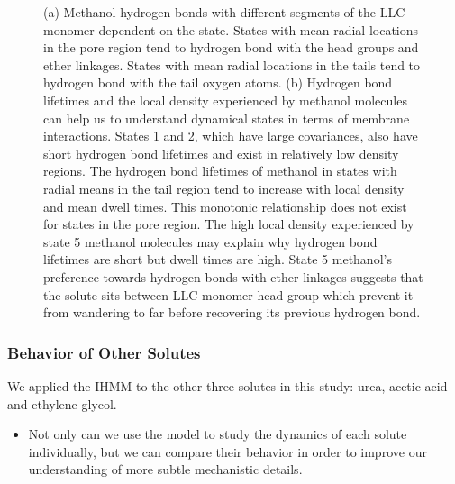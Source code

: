\documentclass{article}
\begin{document}
\begin{figure}
  \caption{(a) Methanol hydrogen bonds with different segments of the LLC monomer
  dependent on the state. States with mean radial locations in the pore region tend to
  hydrogen bond with the head groups and ether linkages. States with mean radial
  locations in the tails tend to hydrogen bond with the tail oxygen atoms.
  (b) Hydrogen bond lifetimes and the local density experienced by methanol
  molecules can help us to understand dynamical states in terms of membrane 
  interactions. States 1 and 2, which have large covariances, also have short
  hydrogen bond lifetimes and exist in relatively low density regions. The
  hydrogen bond lifetimes of methanol in states with radial means in the tail
  region tend to increase with local density and mean dwell times. 
  This monotonic
  relationship does not exist for states in the pore region. The high 
  local density experienced by state 5 methanol molecules may explain why 
  hydrogen bond lifetimes are short but dwell times are high. State 5 methanol's
  preference towards hydrogen bonds with ether linkages suggests that the solute
  sits between LLC monomer head group which prevent it from wandering to far
  before recovering its previous hydrogen bond.
  }\label{fig:hbond_pichart}
  \end{figure}
  
  
  \subsubsection*{Behavior of Other Solutes}
  
  We applied the IHMM to the other three solutes in this study: urea, acetic acid
  and ethylene glycol. 
  \begin{itemize}  
    \item Not only can we use the model to study the dynamics of each solute 
    individually, but we can compare their behavior in order to improve our
    understanding of more subtle mechanistic details.
  \end{itemize} 
  
\end{document}
